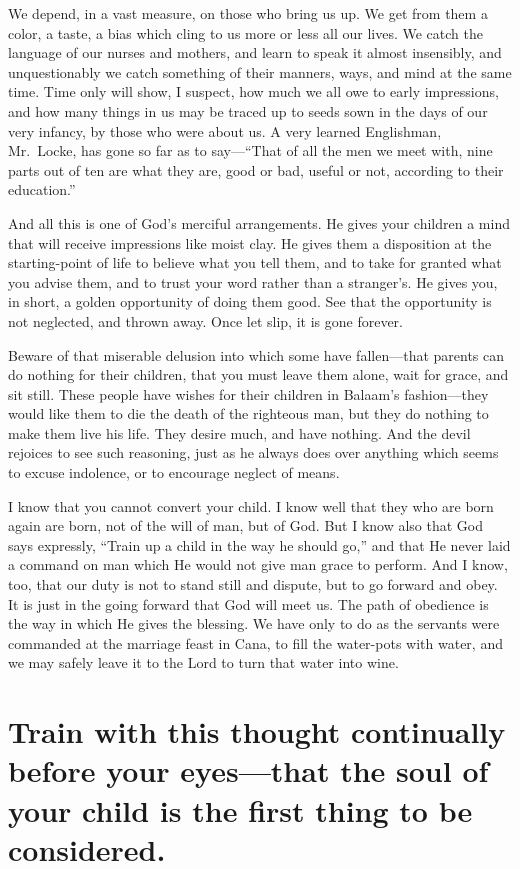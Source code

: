 \documentclass[
]{book}
\begin{document}
We depend, in a vast measure, on those who bring us up. We get from them a color, a taste, a bias which cling to us more or less all our lives. We catch the language of our nurses and mothers, and learn to speak it almost insensibly, and unquestionably we catch something of their manners, ways, and mind at the same time. Time only will show, I suspect, how much we all owe to early impressions, and how many things in us may be traced up to seeds sown in the days of our very infancy, by those who were about us. A very learned Englishman, Mr.~Locke, has gone so far as to say---``That of all the men we meet with, nine parts out of ten are what they are, good or bad, useful or not, according to their education.''

And all this is one of God's merciful arrangements. He gives your children a mind that will receive impressions like moist clay. He gives them a disposition at the starting-point of life to believe what you tell them, and to take for granted what you advise them, and to trust your word rather than a stranger's. He gives you, in short, a golden opportunity of doing them good. See that the opportunity is not neglected, and thrown away. Once let slip, it is gone forever.

Beware of that miserable delusion into which some have fallen---that parents can do nothing for their children, that you must leave them alone, wait for grace, and sit still. These people have wishes for their children in Balaam's fashion---they would like them to die the death of the righteous man, but they do nothing to make them live his life. They desire much, and have nothing. And the devil rejoices to see such reasoning, just as he always does over anything which seems to excuse indolence, or to encourage neglect of means.

I know that you cannot convert your child. I know well that they who are born again are born, not of the will of man, but of God. But I know also that God says expressly, ``Train up a child in the way he should go,'' and that He never laid a command on man which He would not give man grace to perform. And I know, too, that our duty is not to stand still and dispute, but to go forward and obey. It is just in the going forward that God will meet us. The path of obedience is the way in which He gives the blessing. We have only to do as the servants were commanded at the marriage feast in Cana, to fill the water-pots with water, and we may safely leave it to the Lord to turn that water into wine.

\hypertarget{train-with-this-thought-continually-before-your-eyesthat-the-soul-of-your-child-is-the-first-thing-to-be-considered.}{%
\chapter{Train with this thought continually before your eyes---that the soul of your child is the first thing to be considered.}\label{train-with-this-thought-continually-before-your-eyesthat-the-soul-of-your-child-is-the-first-thing-to-be-considered.}}
\end{document}
